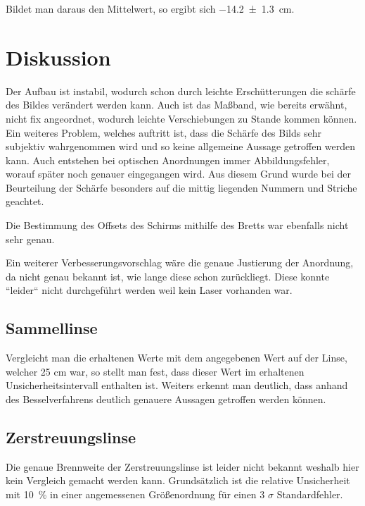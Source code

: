 \documentclass[11pt,ngerman]{scrartcl}
\begin{document}
Bildet man daraus den Mittelwert, so ergibt sich \SI{-14.2(13)}{\cm}.

\newpage

\section{Diskussion}\label{disk}

Der Aufbau ist instabil, wodurch schon durch leichte Erschütterungen die schärfe des Bildes verändert werden kann. Auch ist das Maßband, wie bereits erwähnt, nicht fix angeordnet, wodurch leichte Verschiebungen zu Stande kommen können. Ein weiteres Problem, welches auftritt ist, dass die Schärfe des Bilds sehr subjektiv wahrgenommen wird und so keine allgemeine Aussage getroffen werden kann. Auch entstehen bei optischen Anordnungen immer Abbildungsfehler, worauf später noch genauer eingegangen wird. Aus diesem Grund wurde bei der Beurteilung der Schärfe besonders auf die mittig liegenden Nummern und Striche geachtet.

\vspace{2mm}

Die Bestimmung des Offsets des Schirms mithilfe des Bretts war ebenfalls nicht sehr genau.

\vspace{2mm}

Ein weiterer Verbesserungsvorschlag wäre die genaue Justierung der Anordnung, da nicht genau bekannt ist, wie lange diese schon zurückliegt. Diese konnte ``leider`` nicht durchgeführt werden weil kein Laser vorhanden war.

\subsection{Sammellinse}

Vergleicht man die erhaltenen Werte mit dem angegebenen Wert auf der Linse, welcher 25 cm war, so stellt man fest, dass dieser Wert im erhaltenen Unsicherheitsintervall enthalten ist. Weiters erkennt man deutlich, dass anhand des Besselverfahrens deutlich genauere Aussagen getroffen werden können.

\subsection{Zerstreuungslinse}

Die genaue Brennweite der Zerstreuungslinse ist leider nicht bekannt weshalb hier kein Vergleich gemacht werden kann. Grundsätzlich ist die relative Unsicherheit mit \SI{10}{\percent} in einer angemessenen Größenordnung für einen 3 $\sigma$ Standardfehler.
\end{document}
